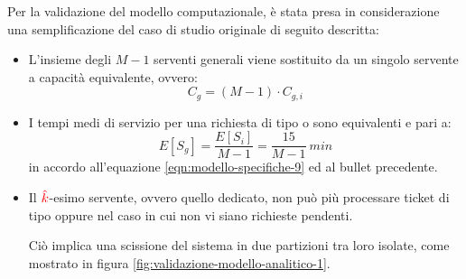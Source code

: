 Per la validazione del modello computazionale, è stata presa in considerazione una semplificazione del caso di studio originale di seguito descritta:
\begin{itemize}
\item L'insieme degli $M-1$ serventi generali viene sostituito da un singolo servente a capacità equivalente, ovvero:
\begin{equation}
C_g = (M-1)\cdot C_{g,i}
\end{equation}
\item I tempi medi di servizio per una richiesta di tipo \uo{} o \pp{} sono equivalenti e pari a:
\begin{equation}
E[S_g] = \frac{E[S_i]}{M-1} = \frac{15}{M-1}\ min
\end{equation} 
in accordo all'equazione \ref{eqn:modello-specifiche-9} ed al bullet precedente.
\item Il ${\color{red}\hat{k}}{}$-esimo servente, ovvero quello dedicato, non può più processare ticket di tipo \uo{} oppure \pp{} nel caso in cui non vi siano richieste \sr{} pendenti.

Ciò implica una scissione del sistema in due partizioni tra loro isolate, come mostrato in figura \ref{fig:validazione-modello-analitico-1}.
\end{itemize}

